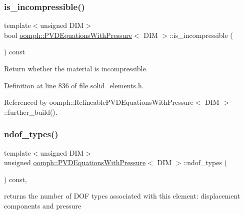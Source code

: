 \subsubsection{\texorpdfstring{is\+\_\+incompressible()}{is\_incompressible()}}
{\footnotesize\ttfamily template$<$unsigned D\+IM$>$ \\
bool \hyperlink{classoomph_1_1PVDEquationsWithPressure}{oomph\+::\+P\+V\+D\+Equations\+With\+Pressure}$<$ D\+IM $>$\+::is\+\_\+incompressible (\begin{DoxyParamCaption}{ }\end{DoxyParamCaption}) const\hspace{0.3cm}{\ttfamily [inline]}}



Return whether the material is incompressible. 



Definition at line 836 of file solid\+\_\+elements.\+h.



Referenced by oomph\+::\+Refineable\+P\+V\+D\+Equations\+With\+Pressure$<$ D\+I\+M $>$\+::further\+\_\+build().

\mbox{\label{classoomph_1_1PVDEquationsWithPressure_ac7b6036faac154cd6a535ab5083c6d84}} 
\subsubsection{\texorpdfstring{ndof\+\_\+types()}{ndof\_types()}}
{\footnotesize\ttfamily template$<$unsigned D\+IM$>$ \\
unsigned \hyperlink{classoomph_1_1PVDEquationsWithPressure}{oomph\+::\+P\+V\+D\+Equations\+With\+Pressure}$<$ D\+IM $>$\+::ndof\+\_\+types (\begin{DoxyParamCaption}{ }\end{DoxyParamCaption}) const\hspace{0.3cm}{\ttfamily [inline]}, {\ttfamily [virtual]}}



returns the number of D\+OF types associated with this element\+: displacement components and pressure 



